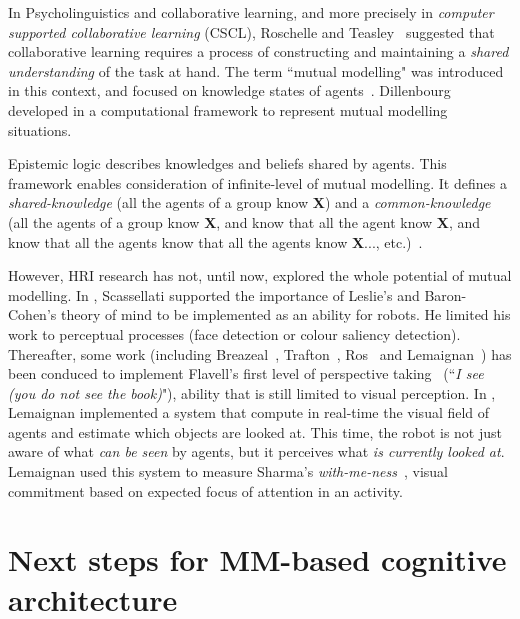 \documentclass[conference]{IEEEtran}
\begin{document}
In Psycholinguistics and collaborative learning, and more precisely in \textit{computer supported collaborative learning} (CSCL), Roschelle and Teasley~\cite{roschelle1995construction} suggested that collaborative learning requires a process of constructing and maintaining a \textit{shared understanding} of the task at hand. 
The term ``mutual modelling" was introduced in this context, and focused on knowledge states of agents~\cite{dillenbourg1999you}. Dillenbourg developed in \cite{sangin2007partner} a computational framework to represent mutual modelling situations.

Epistemic logic describes knowledges and beliefs shared by agents. This framework enables consideration of infinite-level of mutual modelling. It defines a \textit{shared-knowledge} (all the agents of a group know \textbf{X}) and a \textit{common-knowledge} (all the agents of a group know \textbf{X}, and know that all the agent know \textbf{X}, and know that all the agents know that all the agents know \textbf{X}..., etc.)~\cite{hendricks2008epistemic}. 

However, HRI research has not, until now, explored the whole potential of mutual modelling. In \cite{scassellati2002theory}, Scassellati supported the importance of Leslie's and Baron-Cohen's theory of mind to be implemented as an ability for robots. He limited his work to perceptual processes (face detection or colour saliency detection). Thereafter, some work (including Breazeal~\cite{breazeal2006using}, Trafton~\cite{Trafton2005}, Ros~\cite{Ros2010} and Lemaignan~\cite{lemaignan2012thesis}) has been conduced to implement Flavell's first level of perspective taking~\cite{flavell1977development} (``\textit{I see (you do not see the book)}"), ability that is still limited to visual perception. In \cite{lemaignan2016realtime}, Lemaignan implemented a system that compute in real-time the visual field of agents and estimate which objects are looked at. This time, the robot is not just aware of what \textit{can be seen} by agents, but it perceives what \textit{is currently looked at}. Lemaignan used this system to measure Sharma's \textit{with-me-ness}~\cite{sharma2014me}, visual commitment based on expected focus of attention in an activity. 

\section{Next steps for MM-based cognitive architecture}
\end{document}
